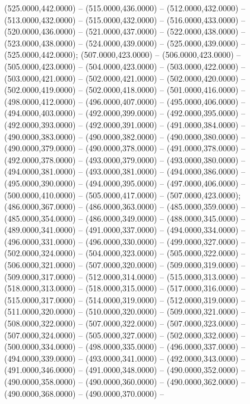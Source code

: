 \begin{scope}[draw=black,fill=cffffbf,line join=round,line width=0.208pt]
   (525.0000,442.0000) -- (515.0000,436.0000) --
    (512.0000,432.0000) -- (513.0000,432.0000) -- (515.0000,432.0000) --
    (516.0000,433.0000) -- (520.0000,436.0000) -- (521.0000,437.0000) --
    (522.0000,438.0000) -- (523.0000,438.0000) -- (524.0000,439.0000) --
    (525.0000,439.0000) -- (525.0000,442.0000);
   (507.0000,423.0000) -- (506.0000,423.0000) --
    (505.0000,423.0000) -- (504.0000,423.0000) -- (503.0000,422.0000) --
    (503.0000,421.0000) -- (502.0000,421.0000) -- (502.0000,420.0000) --
    (502.0000,419.0000) -- (502.0000,418.0000) -- (501.0000,416.0000) --
    (498.0000,412.0000) -- (496.0000,407.0000) -- (495.0000,406.0000) --
    (494.0000,403.0000) -- (492.0000,399.0000) -- (492.0000,395.0000) --
    (492.0000,393.0000) -- (492.0000,391.0000) -- (491.0000,384.0000) --
    (490.0000,383.0000) -- (490.0000,382.0000) -- (490.0000,380.0000) --
    (490.0000,379.0000) -- (490.0000,378.0000) -- (491.0000,378.0000) --
    (492.0000,378.0000) -- (493.0000,379.0000) -- (493.0000,380.0000) --
    (494.0000,381.0000) -- (493.0000,381.0000) -- (494.0000,386.0000) --
    (495.0000,390.0000) -- (494.0000,395.0000) -- (497.0000,406.0000) --
    (500.0000,410.0000) -- (505.0000,417.0000) -- (507.0000,423.0000);
   (486.0000,367.0000) -- (486.0000,363.0000) --
    (485.0000,359.0000) -- (485.0000,354.0000) -- (486.0000,349.0000) --
    (488.0000,345.0000) -- (489.0000,341.0000) -- (491.0000,337.0000) --
    (494.0000,334.0000) -- (496.0000,331.0000) -- (496.0000,330.0000) --
    (499.0000,327.0000) -- (502.0000,324.0000) -- (504.0000,323.0000) --
    (505.0000,322.0000) -- (506.0000,321.0000) -- (507.0000,320.0000) --
    (509.0000,319.0000) -- (509.0000,317.0000) -- (512.0000,314.0000) --
    (515.0000,313.0000) -- (518.0000,313.0000) -- (518.0000,315.0000) --
    (517.0000,316.0000) -- (515.0000,317.0000) -- (514.0000,319.0000) --
    (512.0000,319.0000) -- (511.0000,320.0000) -- (510.0000,320.0000) --
    (509.0000,321.0000) -- (508.0000,322.0000) -- (507.0000,322.0000) --
    (507.0000,323.0000) -- (507.0000,324.0000) -- (505.0000,327.0000) --
    (502.0000,332.0000) -- (500.0000,334.0000) -- (498.0000,335.0000) --
    (496.0000,337.0000) -- (494.0000,339.0000) -- (493.0000,341.0000) --
    (492.0000,343.0000) -- (491.0000,346.0000) -- (491.0000,348.0000) --
    (490.0000,352.0000) -- (490.0000,358.0000) -- (490.0000,360.0000) --
    (490.0000,362.0000) -- (490.0000,368.0000) -- (490.0000,370.0000) --

\end{scope}
